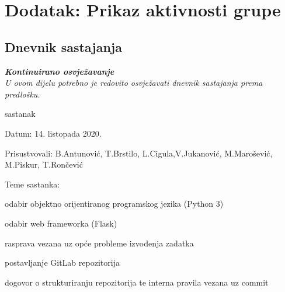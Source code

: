 \chapter*{Dodatak: Prikaz aktivnosti grupe}
		
		\section*{Dnevnik sastajanja}
		
		\textbf{\textit{Kontinuirano osvježavanje}}\\
		
		 \textit{U ovom dijelu potrebno je redovito osvježavati dnevnik sastajanja prema predlošku.}
		
		\begin{packed_enum}
			\item  sastanak
			
			\item[] \begin{packed_item}
				\item Datum: 14. listopada 2020.
				\item Prisustvovali: B.Antunović, T.Brstilo, L.Cigula,V.Jukanović, M.Marošević, M.Piskur, T.Rončević
				\item Teme sastanka:
				\begin{packed_item}
					\item  odabir objektno orijentiranog programskog jezika (Python 3)
					\item  odabir web frameworka (Flask)
					\item  rasprava vezana uz opće probleme izvođenja zadatka
					\item  postavljanje GitLab repozitorija
					\item  dogovor o strukturiranju repozitorija te interna pravila vezana uz commit
				\end{packed_item}
			\end{packed_item}
			

\end{packed_enum}
